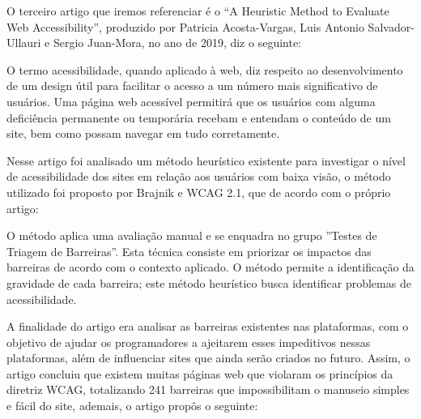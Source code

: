 \documentclass[a4paper]{article}
\begin{document}
\begin{titlepage}
O terceiro artigo que iremos referenciar é o “A Heuristic Method to Evaluate Web Accessibility”, produzido por Patricia Acosta-Vargas, Luis Antonio Salvador-Ullauri e Sergio Juan-Mora, no ano de 2019, diz o seguinte:\\[0.5cm]

\hspace{0.19\textwidth} %
\begin{minipage}{0.75\textwidth}
	\fontsize{10pt}{0pt}\selectfont
	O termo acessibilidade, quando aplicado à web, diz respeito ao desenvolvimento de um design útil para facilitar o acesso a um número mais significativo de usuários. Uma página web acessível permitirá que os usuários com alguma deficiência permanente ou temporária recebam e entendam o conteúdo de um site, bem como possam navegar em tudo corretamente.\\[0.5cm]
\end{minipage}

Nesse artigo foi analisado um método heurístico existente para investigar o nível de acessibilidade dos sites em relação aos usuários com baixa visão, o método utilizado foi proposto por Brajnik e WCAG 2.1, que de acordo com o próprio artigo:\\[0.5cm]

\hspace{0.19\textwidth} %
\begin{minipage}{0.75\textwidth}
	\fontsize{10pt}{0pt}\selectfont
	O método aplica uma avaliação manual e se enquadra no grupo ''Testes de Triagem de Barreiras''. Esta técnica consiste em priorizar os impactos das barreiras de acordo com o contexto aplicado. O método permite a identificação da gravidade de cada barreira; este método heurístico busca identificar problemas de acessibilidade.\\[0.5cm]
\end{minipage}

A finalidade do artigo era analisar as barreiras existentes nas plataformas, com o objetivo de ajudar os programadores a ajeitarem esses impeditivos nessas plataformas, além de influenciar sites que ainda serão criados no futuro. Assim, o artigo concluiu que existem muitas páginas web que violaram os princípios da diretriz WCAG, totalizando 241 barreiras que impossibilitam o manuseio simples e fácil do site, ademais, o artigo propôs o seguinte:\\[0.5cm]


\end{titlepage}
\end{document}
